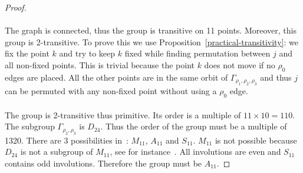\begin{proof}
\begin{figure}[H]
\begin{center}
    \caption{}
  \end{center}
\end{figure}

\paragraph{}
The graph is connected, thus the group is transitive on 11 points. Moreover, this group is 2-transitive. To prove this we use Proposition~\ref{practical-transitivity}: we fix the point $k$ and try to keep $k$ fixed while finding permutation between $j$ and all non-fixed points. This is trivial because the point $k$ does not move if no $\rho_0$ edges are placed. All the other points are in the same orbit of $\Gamma_{\rho_1, \rho_2, \rho_3}$ and thus $j$ can be permuted with any non-fixed point without using a $\rho_0$ edge.

\paragraph{}
The group is 2-transitive thus primitive. Its order is a multiple of $11 \times 10 = 110$. The subgroup $\Gamma_{\rho_2, \rho_3}$ is $D_{24}$. Thus the order of the group must be a multiple of 1320. There are 3 possibilities in~\cite{buekenhout1996list}: $M_{11}$, $A_{11}$ and $S_{11}$. $M_{11}$ is not possible because $D_{24}$ is not a subgroup of $M_{11}$, see for instance~\cite{connor2013atlas}. All involutions are even and $S_{11}$ contains odd involutions. Therefore the group must be $A_{11}$.


\end{proof}

